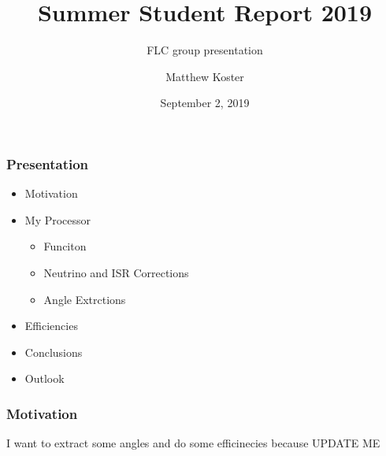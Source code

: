 

\title[Summer Student Report 2019]{Summer Student Report 2019}
\subtitle{FLC group presentation}
\author[Matthew Koster]{ Matthew Koster }%
\date{September 2, 2019}

\newcommand{\imagepath}{/Users/mbk/Documents/LATEX/SummerStudentReportTemplate-master/Plots/high_stat}
\newcommand{\feynmanpath}{/Users/mbk/Documents/LATEX/SummerStudentReportTemplate-master/LaTeX/FeynmanDiagrams}





\makemytitlepage



\begin{frame}\frametitle{Presentation }
    \begin{itemize}
      \item Motivation
      \item My Processor
      \begin{itemize}
          \item Funciton
          \item Neutrino and ISR Corrections
          \item Angle Extrctions
      \end{itemize}
      \item Efficiencies
      \item Conclusions
      \item Outlook
    \end{itemize}
\end{frame}



\begin{frame}\frametitle{Motivation }
I want to extract some angles and do some efficinecies because UPDATE ME
\end{frame}


